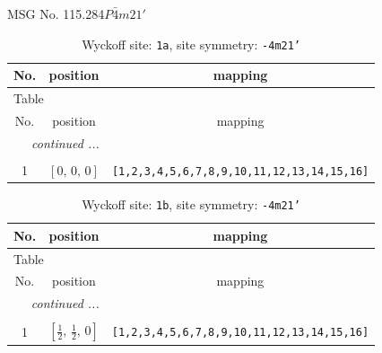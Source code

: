 \documentclass[fleqn,8pt]{jsarticle}
\begin{document}
\setcounter{MaxMatrixCols}{32}

\renewcommand{\tablename}{Table~}
\renewcommand{\figurename}{Figure~}
\begin{center}
\LARGE
MSG No. 115.284\quad$P\bar{4}m21'$
\end{center}
\renewcommand{\arraystretch}{1.2}
\begin{longtable}{ccc}
\caption{Wyckoff site: {\tt 1a}, site symmetry: {\tt -4m21'}}
 \\
 \hline \hline
No. & position & mapping \\ \hline \endfirsthead

\multicolumn{2}{l}{\tablename\ \thetable{}} \\
 \hline \hline
No. & position & mapping \\ \hline \endhead

 \hline \hline
\multicolumn{2}{r}{\footnotesize\it continued ...} \\ \endfoot

 \hline \hline
\multicolumn{2}{r}{} \\ \endlastfoot

1 & $\left[ 0,\, 0,\, 0 \right]$ & {\tt [1,2,3,4,5,6,7,8,9,10,11,12,13,14,15,16]} \\
\end{longtable}
\renewcommand{\arraystretch}{1.2}
\begin{longtable}{ccc}
\caption{Wyckoff site: {\tt 1b}, site symmetry: {\tt -4m21'}}
 \\
 \hline \hline
No. & position & mapping \\ \hline \endfirsthead

\multicolumn{2}{l}{\tablename\ \thetable{}} \\
 \hline \hline
No. & position & mapping \\ \hline \endhead

 \hline \hline
\multicolumn{2}{r}{\footnotesize\it continued ...} \\ \endfoot

 \hline \hline
\multicolumn{2}{r}{} \\ \endlastfoot

1 & $\left[ \frac{1}{2},\, \frac{1}{2},\, 0 \right]$ & {\tt [1,2,3,4,5,6,7,8,9,10,11,12,13,14,15,16]} \\
\end{longtable}
\renewcommand{\arraystretch}{1.2}
\end{document}

